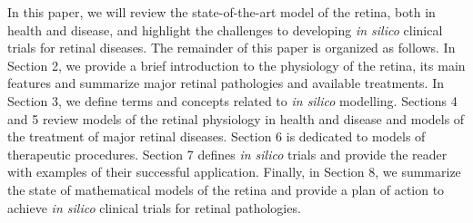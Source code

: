 \documentclass[12pt,a4paper]{article}
\begin{document}
In this paper, we will review the state-of-the-art model of the retina, both in health and disease, and highlight the challenges to developing \textit{in silico} clinical trials for retinal diseases.
The remainder of this paper is organized as follows.
In Section 2, we provide a brief introduction to the physiology of the retina, its main features and summarize major retinal pathologies and available treatments.
In Section 3, we define terms and concepts related to \textit{in silico} modelling.
Sections 4 and 5 review models of the retinal physiology in health and disease and models of the treatment of major retinal diseases.
Section 6 is dedicated to models of therapeutic procedures.
Section 7 defines \textit{in silico} trials and provide the reader with examples of their successful application.
Finally, in Section 8, we summarize the state of mathematical models of the retina and provide a plan of action to achieve \textit{in silico} clinical trials for retinal pathologies.
\end{document}
